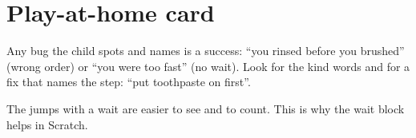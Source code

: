\section{Play-at-home card}
\begin{answer}
Any bug the child spots and names is a success: \enquote{you rinsed before you brushed} (wrong order) or \enquote{you were too fast} (no wait). Look for the kind words and for a fix that names the step: \enquote{put toothpaste on first}.
\end{answer}

\begin{answer}
The jumps with a wait are easier to see and to count. This is why the wait block helps in Scratch.
\end{answer}
